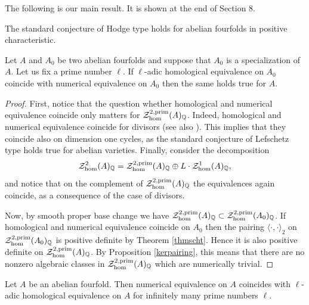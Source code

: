 The following is our main result. It is shown at the end of Section 8.
\begin{theorem}
\notready\label{thmscht}
The standard conjecture of Hodge type holds for abelian fourfolds in positive characteristic.
\end{theorem}

\begin{corollary}
\notready\label{thmhomnum}
Let $A$ and $A_0$ be two   abelian fourfolds and suppose that  $A_0$ is a specialization of $A$. Let us fix a prime number $\ell$. If  $\ell$-adic homological equivalence on $A_0$ coincide with numerical equivalence on $A_0$ then the same holds true for $A$.
\end{corollary}
\begin{proof} First, notice that the question whether homological and numerical equivalence coincide only matters for $\mathcal{Z}_{\hom}^{2,\mathrm{prim}}(A)_{\mathbb{Q}}$. Indeed, homological and numerical equivalence coincide for divisors \cite{matsu} (see also \cite[Proposition 3.4.6.1]{Andmot}). This implies   that they coincide also on dimension one cycles,   as the standard conjecture of Lefschetz type holds true for abelian varieties. Finally, consider the decomposition \[\mathcal{Z}_{\hom}^{2 }(A)_{\mathbb{Q}} =\mathcal{Z}_{\hom}^{2,\mathrm{prim}}(A)_{\mathbb{Q}} \oplus L \cdot \mathcal{Z}_{\hom}^{1}(A)_{\mathbb{Q}},\]
and notice that on the complement of $\mathcal{Z}_{\hom}^{2,\mathrm{prim}}(A)_{\mathbb{Q}} $ the equivalences again coincide, as a consequence of the case of divisors.

Now, by smooth proper base change we have $\mathcal{Z}_{\hom}^{2,\mathrm{prim}}(A)_{\mathbb{Q}}\subset \mathcal{Z}_{\hom}^{2,\mathrm{prim}}(A_0)_{\mathbb{Q}}$. If    homological and numerical equivalence  coincide on $A_0$ then the pairing $\langle \cdot, \cdot \rangle_{2}$ on  $\mathcal{Z}_{\hom}^{2,\mathrm{prim}}(A_0)_{\mathbb{Q}}$ is positive definite by Theorem \ref{thmscht}. Hence it is also positive definite on $\mathcal{Z}_{\hom}^{2,\mathrm{prim}}(A)_{\mathbb{Q}}$.   By  Proposition \ref{kerpairing}, this means that there are no nonzero algebraic classes in $\mathcal{Z}_{\hom}^{2,\mathrm{prim}}(A)_{\mathbb{Q}}$ which are numerically trivial.
\end{proof}
\begin{theorem}
\notready\label{thmclozel}
Let $A$ be an   abelian fourfold. Then numerical equivalence on $A$ coincides with $\ell$-adic homological equivalence on $A$ for infinitely many prime numbers $\ell$.
\end{theorem}
